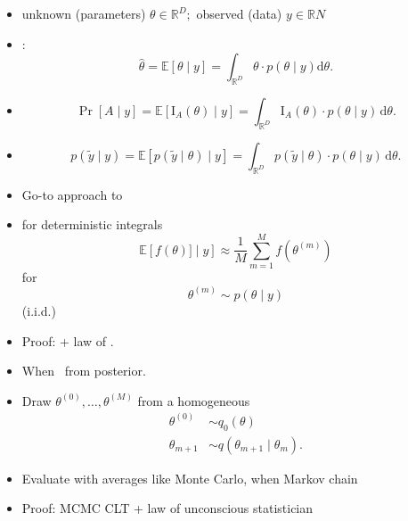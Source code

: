 \documentclass[9pt]{report}
\newcommand{\expect}[1]{\mathbb{E}\!\left[ #1 \right]}
\newcommand{\reals}{\mathbb{R}}
\newcommand{\draw}[2]{#1^{(#2)}}
\begin{document}
\begin{itemize}
\item unknown (parameters) $\theta \in \reals^D;$ \quad
  observed (data) $y \in \reals{N}$
\item {}:
$$
\widehat{\theta}
= \expect{\theta \mid y}
= \int_{\reals^D} \theta \cdot p(\theta \mid y) \textrm{d}\theta.
$$
\item {}
$$
\Pr[A \mid y]
= \expect{\textrm{I}_{A}(\theta) \mid y}
= \int_{\reals^D} \textrm{I}_{A}(\theta) \cdot p(\theta \mid y) \, \textrm{d}\theta.
$$
\item {}
$$
p(\tilde{y} \mid y)
= \expect{p(\tilde y \mid \theta) \mid y}
= \int_{\mathbb{R}^D} p(\tilde{y} \mid \theta) \cdot p(\theta \mid
  y) \, \textrm{d}\theta.
$$
\end{itemize}

\sld{}
\vfill
\begin{center}
\Huge {}
\end{center}
\vfill
\vfill

\begin{itemize}
\item Go-to approach to 
\item {} for deterministic integrals 
$$
\expect{f(\theta)] \mid y}
\approx \frac{1}{M} \sum_{m = 1}^M f\!\left(\draw{\theta}{m}\right) 
$$
for 
$$
\draw{\theta}{m} \sim p(\theta \mid y) 
$$
 (i.i.d.) 
\item Proof: 
  + law of . 
\end{itemize}

\begin{itemize}
\item When \ from posterior.
\item Draw $\draw{\theta}{0}, \ldots, \draw{\theta}{M}$ from a
  homogeneous 
\begin{align}
\draw{\theta}{0} &\sim q_0(\theta)
  \\[8pt]
  \theta_{m + 1} &\sim q(\theta_{m + 1} \mid \theta_{m}).
\end{align}
\item Evaluate with averages like Monte Carlo, when Markov chain 
\item Proof: MCMC CLT + law of unconscious statistician
\end{itemize}
\end{document}
